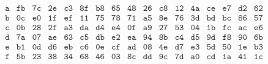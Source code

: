 \begin{ejs}
\begin{table}[H]
\[\begin{array}{c|*{16}{c}}
\texttt{a} & \texttt{fb} & \texttt{7c} & \texttt{2e} & \texttt{c3} & \texttt{8f} & \texttt{b8} & \texttt{65} & \texttt{48} & \texttt{26} & \texttt{c8} & \texttt{12} & \texttt{4a} & \texttt{ce} & \texttt{e7} & \texttt{d2} & \texttt{62} \\
\texttt{b} & \texttt{0c} & \texttt{e0} & \texttt{1f} & \texttt{ef} & \texttt{11} & \texttt{75} & \texttt{78} & \texttt{71} & \texttt{a5} & \texttt{8e} & \texttt{76} & \texttt{3d} & \texttt{bd} & \texttt{bc} & \texttt{86} & \texttt{57} \\
\texttt{c} & \texttt{0b} & \texttt{28} & \texttt{2f} & \texttt{a3} & \texttt{da} & \texttt{d4} & \texttt{e4} & \texttt{0f} & \texttt{a9} & \texttt{27} & \texttt{53} & \texttt{04} & \texttt{1b} & \texttt{fc} & \texttt{ac} & \texttt{e6} \\
\texttt{d} & \texttt{7a} & \texttt{07} & \texttt{ae} & \texttt{63} & \texttt{c5} & \texttt{db} & \texttt{e2} & \texttt{ea} & \texttt{94} & \texttt{8b} & \texttt{c4} & \texttt{d5} & \texttt{9d} & \texttt{f8} & \texttt{90} & \texttt{6b} \\
\texttt{e} & \texttt{b1} & \texttt{0d} & \texttt{d6} & \texttt{eb} & \texttt{c6} & \texttt{0e} & \texttt{cf} & \texttt{ad} & \texttt{08} & \texttt{4e} & \texttt{d7} & \texttt{e3} & \texttt{5d} & \texttt{50} & \texttt{1e} & \texttt{b3} \\
\texttt{f} & \texttt{5b} & \texttt{23} & \texttt{38} & \texttt{34} & \texttt{68} & \texttt{46} & \texttt{03} & \texttt{8c} & \texttt{dd} & \texttt{9c} & \texttt{7d} & \texttt{a0} & \texttt{cd} & \texttt{1a} & \texttt{41} & \texttt{1c} \\
\end{array}
\]
\vspace{-1.2em}
\caption{Inversos en $\Z_2[x]/(x^8 + x^4 + x^3 + x + 1)$ expresados en hexadecimal.}
\label{tab:invGF256}
\end{table}
\vspace{-0.3em}


\end{ejs}



    
